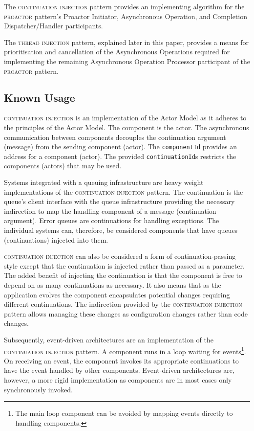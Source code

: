 \documentclass[prodmode]{style/acmlarge}
\begin{document}
The \textsc{continuation injection} pattern provides an implementing algorithm
for the \textsc{proactor} pattern's Proactor Initiator, Asynchronous Operation,
and Completion Dispatcher/Handler participants.

The \textsc{thread injection} pattern, explained later in this paper, provides a
means for prioritisation and cancellation of the Asynchronous Operations
required for implementing the remaining Asynchronous Operation Processor
participant of the \textsc{proactor} pattern.


\subsection{Known Usage}

\textsc{continuation injection} is an implementation of the Actor Model
\cite{actors} as it adheres to the principles of the Actor Model.  The component
is the actor.  The asynchronous communication between components decouples the continuation
argument (message) from the sending component (actor).  The \texttt{componentId}
provides an address for a component (actor).  The provided
\texttt{continuationId}s restricts the components (actors) that may be used.

Systems integrated with a queuing infrastructure are heavy weight
implementations of the \textsc{continuation injection} pattern.  The
continuation is the queue's client interface with the queue infrastructure
providing the necessary indirection to map the handling component of a message
(continuation argument).  Error queues are continuations for handling
exceptions.  The individual systems can, therefore, be considered components
that have queues (continuations) injected into them.

\textsc{continuation injection} can also be considered a form of
continuation-passing style \cite{continuations} except that the continuation is
injected rather than passed as a parameter.  The added benefit of injecting the
continuation is that the component is free to depend on as many continuations as
necessary.  It also means that as the application evolves the component
encapsulates potential changes requiring different continuations.  The
indirection provided by the \textsc{continuation injection} pattern allows
managing these changes as configuration changes rather than code changes.

Subsequently, event-driven architectures are an implementation of the
\textsc{continuation injection} pattern.  A component runs in a loop waiting for
events\footnote{The main loop component can be avoided by mapping events
directly to handling components.}.  On receiving an event, the component invokes
its appropriate continuations to have the event handled by other components.
Event-driven architectures are, however, a more rigid implementation as
components are in most cases only synchronously invoked.
\end{document}
